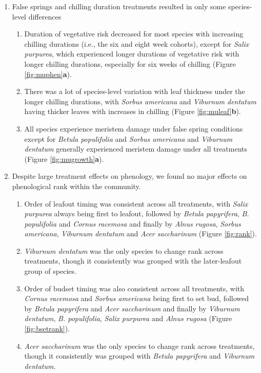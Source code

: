 \documentclass{article}\usepackage[]{graphicx}\usepackage[]{color}
\begin{document}
\begin{enumerate}
\item False springs and chilling duration treatments resulted in only some species-level differences %
 \begin{enumerate}
  \item Duration of vegetative risk decreased for most species with increasing chilling durations (i.e., the six and eight week cohorts), except for \textit{Salix purpurea}, which experienced longer durations of vegetative risk with longer chilling durations, especially for six weeks of chilling (Figure \ref{fig:muphen}\textbf{a}). 
  \item There was a lot of species-level variation with leaf thickness under the longer chilling durations, with \textit{Sorbus americana} and \textit{Viburnum dentatum} having thicker leaves with increases in chilling (Figure \ref{fig:muleaf}\textbf{b}). 
  \item All species experience meristem damage under false spring conditions except for \textit{Betula populifolia} and \textit{Sorbus americana} and \textit{Viburnum dentatum} generally experienced meristem damage under all treatments (Figure \ref{fig:mugrowth}\textbf{a}). 
  \end{enumerate}
  
\item Despite large treatment effects on phenology, we found no major effects on phenological rank within the community.
  \begin{enumerate}
  \item Order of leafout timing was consistent across all treatments, with \textit{Salix purpurea} always being first to leafout, followed by \textit{Betula papyrifera}, \textit{B. populifolia} and \textit{Cornus racemosa} and finally by \textit{Alnus rugosa}, \textit{Sorbus americana}, \textit{Viburnum dentatum} and \textit{Acer saccharinum} (Figure \ref{fig:rank}).
  \item \textit{Viburnum dentatum} was the only species to change rank across treatments, though it consistently was grouped with the later-leafout group of species.
  \item Order of budset timing was also consistent across all treatments, with \textit{Cornus racemosa} and \textit{Sorbus americana} being first to set bud, followed by \textit{Betula papyrifera} and \textit{Acer saccharinum} and finally by \textit{Viburnum dentatum}, \textit{B. populifolia}, \textit{Salix purpurea} and \textit{Alnus rugosa} (Figure \ref{fig:bsetrank}).
  \item \textit{Acer saccharinum} was the only species to change rank across treatments, though it consistently was grouped with \textit{Betula papyrifera} and \textit{Viburnum dentatum}.
  \end{enumerate}
\end{enumerate}
\end{document}
